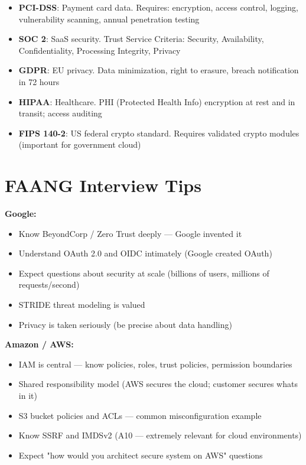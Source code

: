 \documentclass[11pt]{article}
\providecommand{\tightlist}{\setlength{\itemsep}{1pt}\setlength{\parskip}{0pt}}
\begin{document}
\begin{itemize}
\tightlist
\item
  \textbf{PCI-DSS}: Payment card data. Requires: encryption, access control, logging, vulnerability scanning, annual penetration testing
\item
  \textbf{SOC 2}: SaaS security. Trust Service Criteria: Security, Availability, Confidentiality, Processing Integrity, Privacy
\item
  \textbf{GDPR}: EU privacy. Data minimization, right to erasure, breach notification in 72 hours
\item
  \textbf{HIPAA}: Healthcare. PHI (Protected Health Info) encryption at rest and in transit; access auditing
\item
  \textbf{FIPS 140-2}: US federal crypto standard. Requires validated crypto modules (important for government cloud)
\end{itemize}

\section{FAANG Interview Tips}\label{faang-interview-tips}

\textbf{Google:}

\begin{itemize}
\tightlist
\item
  Know BeyondCorp / Zero Trust deeply --- Google invented it
\item
  Understand OAuth 2.0 and OIDC intimately (Google created OAuth)
\item
  Expect questions about security at scale (billions of users, millions of requests/second)
\item
  STRIDE threat modeling is valued
\item
  Privacy is taken seriously (be precise about data handling)
\end{itemize}

\textbf{Amazon / AWS:}

\begin{itemize}
\tightlist
\item
  IAM is central --- know policies, roles, trust policies, permission boundaries
\item
  Shared responsibility model (AWS secures the cloud; customer secures what\textquotesingle s in it)
\item
  S3 bucket policies and ACLs --- common misconfiguration example
\item
  Know SSRF and IMDSv2 (A10 --- extremely relevant for cloud environments)
\item
  Expect "how would you architect secure system on AWS" questions
\end{itemize}
\end{document}

